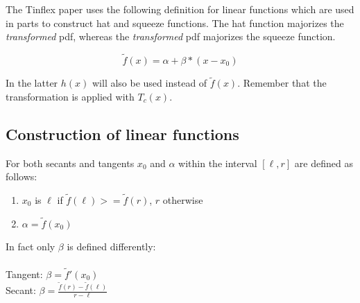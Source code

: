 The Tinflex paper uses the following definition for linear functions which are used in parts to construct hat and squeeze functions. The hat function majorizes the \textit{transformed} pdf, whereas the \textit{transformed} pdf majorizes the squeeze function.

\[ \tilde{f}(x) = \alpha + \beta * (x - x_0) \]

In the latter $h(x)$ will also be used instead of $\tilde{f}(x)$.
Remember that the transformation is applied with $T_c(x)$.

\subsection{Construction of linear functions}

For both secants and tangents $x_0$ and $\alpha$ within the interval $[\ell, r]$ are defined as follows:

\begin{enumerate}
\item $x_0$ is $\ell$ if $\tilde{f}(\ell) >= \tilde{f}(r)$, $r$ otherwise
\item $\alpha = \tilde{f}(x_0)$
\end{enumerate}

In fact only $\beta$ is defined differently: \\ 
\ \\
Tangent: $\beta = \tilde{f}'(x_0)$ \\ 
Secant:  $\beta = \frac{\tilde{f}(r) - \tilde{f}(\ell)}{r - \ell}$



